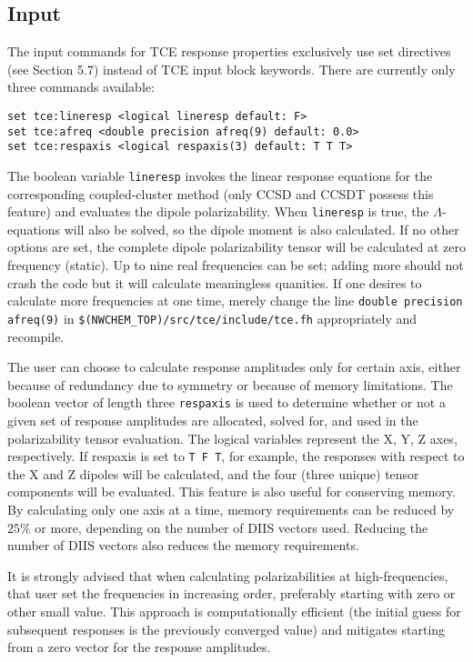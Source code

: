 \subsection{Input}

The input commands for TCE response properties exclusively use set directives (see Section 5.7) instead of TCE input block keywords.  There are currently only three commands available:

\begin{verbatim}
set tce:lineresp <logical lineresp default: F>
set tce:afreq <double precision afreq(9) default: 0.0>
set tce:respaxis <logical respaxis(3) default: T T T>
\end{verbatim}

The boolean variable \verb+lineresp+ invokes the linear response equations for the corresponding coupled-cluster method (only CCSD and CCSDT possess this feature) and evaluates the dipole polarizability.  When \verb+lineresp+ is true, the $\Lambda$-equations will also be solved, so the dipole moment is also calculated.  If no other options are set, the complete dipole polarizability tensor will be calculated at zero frequency (static). Up to nine real frequencies can be set; adding more should not crash the code but it will calculate meaningless quanities.  If one desires to calculate more frequencies at one time, merely change the line \verb+double precision afreq(9)+ in \verb+$(NWCHEM_TOP)/src/tce/include/tce.fh+ appropriately and recompile.

The user can choose to calculate response amplitudes only for certain axis, either because of redundancy due to symmetry or because of memory limitations.  The boolean vector of length three \verb+respaxis+ is used to determine whether or not a given set of response amplitudes are allocated, solved for, and used in the polarizability tensor evaluation.  The logical variables represent the X, Y, Z axes, respectively.  If respaxis is set to \verb+T F T+, for example, the responses with respect to the X and Z dipoles will be calculated, and the four (three unique) tensor components will be evaluated.  This feature is also useful for conserving memory.  By calculating only one axis at a time, memory requirements can be reduced by $25\%$ or more, depending on the number of DIIS vectors used.  Reducing the number of DIIS vectors also reduces the memory requirements.

It is strongly advised that when calculating polarizabilities at high-frequencies, that user set the frequencies in increasing order, preferably starting with zero or other small value.  This approach is computationally efficient (the initial guess for subsequent responses is the previously converged value) and mitigates starting from a zero vector for the response amplitudes.


